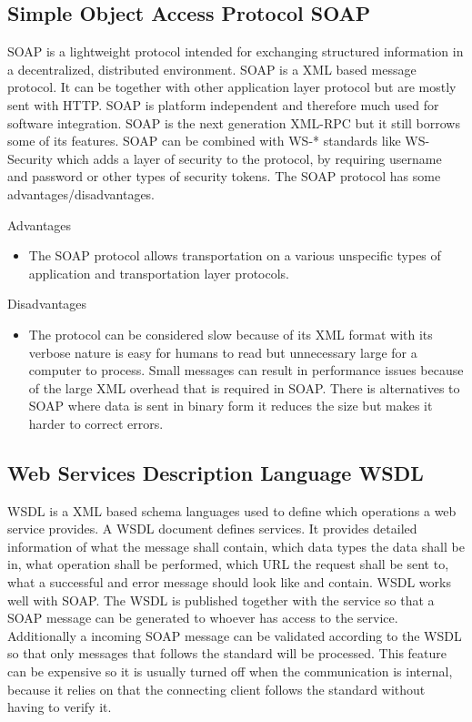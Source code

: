 \documentclass{llncs}
\begin{document}
\subsection{Simple Object Access Protocol SOAP}
SOAP is a lightweight protocol intended for exchanging structured information in a decentralized, distributed environment\cite{w3csoap}. SOAP is a XML based message protocol. It can be together with other application layer protocol but are mostly sent with HTTP. SOAP is platform independent and therefore much used for software  integration. SOAP is the next generation XML-RPC but it still borrows some of its features. SOAP can be combined with WS-* standards like WS-Security which adds a layer of security to the protocol, by requiring username and password or other types of security tokens. The SOAP protocol has some advantages/disadvantages.

Advantages
\begin{itemize}
\item The SOAP protocol allows transportation on a various unspecific types of application and transportation layer protocols.
\end{itemize}
Disadvantages
\begin{itemize}
\item The protocol can be considered slow because of its XML format with its verbose nature is easy for humans to read but unnecessary large for a computer to process. Small messages can result in performance issues because of the large XML overhead that is required in SOAP. There is alternatives to SOAP where data is sent in binary form it reduces the size but makes it harder to correct errors.
\end{itemize}


\subsection{Web Services Description Language WSDL}
WSDL is a XML based schema languages used to define which operations a web service provides. A WSDL document defines services\cite{w3cwsdl}. It provides detailed information of what the message shall contain, which data types the data shall be in, what operation shall be performed, which URL the request shall be sent to, what a successful and error message should look like and contain. WSDL works well with SOAP. The WSDL is published together with the service so that a SOAP message can be generated to whoever has access to the service. Additionally a incoming SOAP message can be validated according to the WSDL so that only messages that follows the standard will be processed. This feature can be expensive so it is usually turned off when the communication is internal, because it relies on that the connecting client follows the standard without having to verify it.
\end{document}
